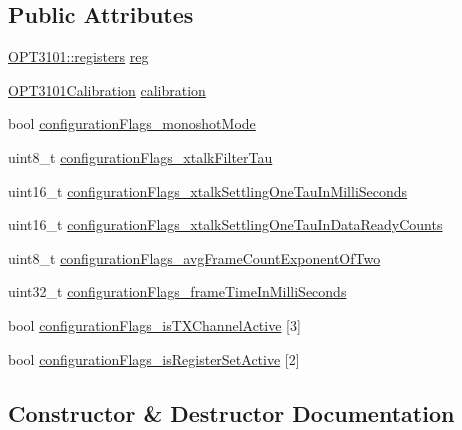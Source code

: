 \subsection*{Public Attributes}
\begin{DoxyCompactItemize}
\item 
\mbox{\hyperlink{class_o_p_t3101_1_1registers}{O\+P\+T3101\+::registers}} \mbox{\hyperlink{class_o_p_t3101device_a702787c83b68e71d5db5ec8cdac57ba0}{reg}}
\item 
\mbox{\hyperlink{class_o_p_t3101_calibration}{O\+P\+T3101\+Calibration}} \mbox{\hyperlink{class_o_p_t3101device_a8f1283a73fbfac90ccc2a8f5ab6ae382}{calibration}}
\item 
bool \mbox{\hyperlink{class_o_p_t3101device_aef9e49f763e74af7ec44f8adfe58879e}{configuration\+Flags\+\_\+monoshot\+Mode}}
\item 
uint8\+\_\+t \mbox{\hyperlink{class_o_p_t3101device_a77ca0f4554ea37a86be99b88818365ac}{configuration\+Flags\+\_\+xtalk\+Filter\+Tau}}
\item 
uint16\+\_\+t \mbox{\hyperlink{class_o_p_t3101device_a6518ba457e85d945792dbd80114e40d8}{configuration\+Flags\+\_\+xtalk\+Settling\+One\+Tau\+In\+Milli\+Seconds}}
\item 
uint16\+\_\+t \mbox{\hyperlink{class_o_p_t3101device_a3f84d9487e61d5141a89d01058d799a9}{configuration\+Flags\+\_\+xtalk\+Settling\+One\+Tau\+In\+Data\+Ready\+Counts}}
\item 
uint8\+\_\+t \mbox{\hyperlink{class_o_p_t3101device_a09ebfac6870717c9ae9152c42db29362}{configuration\+Flags\+\_\+avg\+Frame\+Count\+Exponent\+Of\+Two}}
\item 
uint32\+\_\+t \mbox{\hyperlink{class_o_p_t3101device_ae38d48a69ae6c79669cde8a8746ef6f0}{configuration\+Flags\+\_\+frame\+Time\+In\+Milli\+Seconds}}
\item 
bool \mbox{\hyperlink{class_o_p_t3101device_afbfcfa5559df6b5fab71be3f465545da}{configuration\+Flags\+\_\+is\+T\+X\+Channel\+Active}} \mbox{[}3\mbox{]}
\item 
bool \mbox{\hyperlink{class_o_p_t3101device_a6e157c52c4ae15e416686b2a6abe5299}{configuration\+Flags\+\_\+is\+Register\+Set\+Active}} \mbox{[}2\mbox{]}
\end{DoxyCompactItemize}


\subsection{Constructor \& Destructor Documentation}
\mbox{\label{class_o_p_t3101device_a3d4ce370caefb0970a83e01e1d5f1f90}} 
